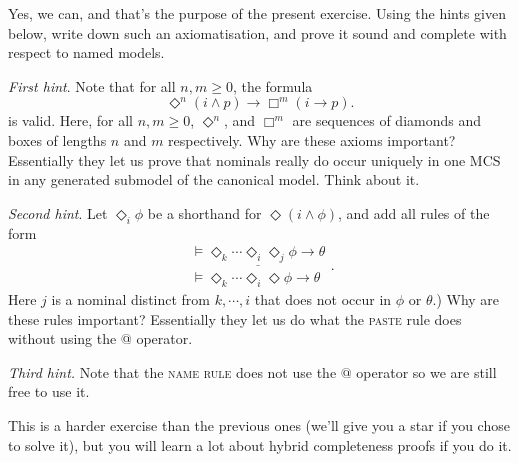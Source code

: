 \documentclass{article}
\begin{document}
Yes, we can, and that's the purpose of the present exercise.  Using
the hints given below, write down such an axiomatisation, and prove it
sound and complete with respect to named models.

\emph{First hint}. Note that for all $n, m\ge 0$, the formula
$$\Diamond^{n}(i\wedge p) \rightarrow \Box^{m} (i \rightarrow p).$$
is valid. 
Here, for all $n,m\ge0$, $\Diamond^{n}$, and $\Box^{m}$ are
sequences of diamonds and boxes of lengths $n$ and $m$ respectively.  Why are
these axioms important?  Essentially they let us prove that nominals
really do occur uniquely in one MCS in any generated submodel of the
canonical model. Think about it.


\emph{Second hint}. Let $\Diamond_{i}\phi$ be a shorthand for
$\Diamond(i\wedge\phi)$, and add all rules of the form
$$
\begin{array}{c} \underline{\models\Diamond_{k}\cdots
\Diamond_{i}\Diamond_{j}\phi \rightarrow \theta} \\
\models\Diamond_{k}\cdots \Diamond_{i}\Diamond \phi \rightarrow \theta   
\end{array}.
$$ 
Here $j$ is a nominal distinct from $k, \cdots ,i$ that does not occur
in $\phi$ or $\theta$.) Why are these rules important?
Essentially they let us do what the \textsc{paste} rule does
without using the @ operator.

\emph{Third hint.} Note that the \textsc{name rule} does not use the $@$ operator
so we are still free to use it.

This is a harder exercise than the previous ones (we'll give you a star if you chose to solve it), but you will learn a
lot about hybrid completeness proofs if you do it.
\end{document}
